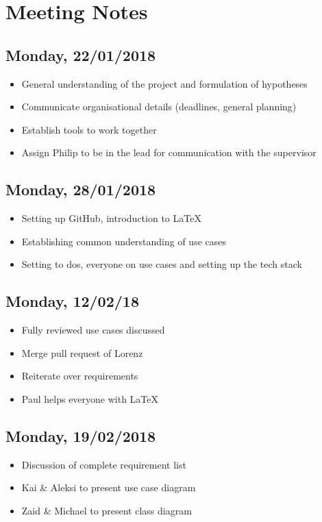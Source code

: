 \chapter{Meeting Notes}
\label{appendix:meetings}

\section{Monday, 22/01/2018}
\begin{itemize}
    \item General understanding of the project and formulation of hypotheses
    \item Communicate organisational details (deadlines, general planning)
    \item Establish tools to work together
    \item Assign Philip to be in the lead for communication with the supervisor
\end{itemize}

\section{Monday, 28/01/2018}
\begin{itemize}
    \item Setting up GitHub, introduction to \LaTeX
    \item Establishing common understanding of use cases
    \item Setting to dos, everyone on use cases and setting up the tech stack
\end{itemize}

\section{Monday, 12/02/18}
\begin{itemize}
    \item Fully reviewed use cases discussed
    \item Merge pull request of Lorenz
    \item Reiterate over requirements
    \item Paul helps everyone with \LaTeX
\end{itemize}

\section{Monday, 19/02/2018}
\begin{itemize}
    \item Discussion of complete requirement list
    \item Kai \& Aleksi to present use case diagram
    \item Zaid \& Michael to present class diagram
\end{itemize}


